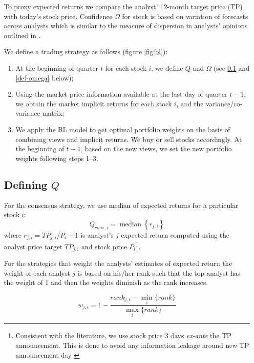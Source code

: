 \documentclass{article}\usepackage[]{graphicx}\usepackage[]{color}
\DeclareMathOperator*{\median}{median}
\begin{document}
To proxy expected returns we compare the analyst' 12-month target price (TP) with today's stock price. Confidence $\Omega$ for stock is based on variation  of forecasts across analysts which is similar to the measure of dispersion in analysts' opinions outlined in \cite{diether2002}.


We define a trading strategy as follows (figure \ref{fig:bl}):
\begin{enumerate}
\item  At the beginning of quarter $t$ for each stock $i$,   we define $Q$ and $\Omega$ (see \ref{def-q} and \ref{def-omega} below);

\item Using the market price information available at the last day of quarter $t-1$, we obtain the market implicit returns for each stock $i$,  and the variance/co-variance matrix;

\item We apply the BL model to get  optimal portfolio weights on the basis of combining views and implicit returns. We  buy or sell stocks accordingly. At the beginning of $t+1$, based on the new views, we set the new portfolio weights following  steps 1--3.
\end{enumerate}

\subsection{Defining $Q$}
\label{def-q}

For the consensus strategy, we use median of expected returns for a particular stock $i$:
\begin{equation}
\label{consq}
Q_{cons,i}= \median \left\{r_{j,i}\right\}
\end{equation}
where $r_{j,i}=TP_{j,i}/P_{i}-1$  is analyst's $j$ expected return computed using the analyst price target $TP_{j,i}$ and stock price $P_{i}$\footnote{Consistent with the literature, we use stock price 3 days \emph{ex-ante} the TP announcement. This is done to avoid any information leakage around new TP announcement day \citep{bonini2010}}. 

For the strategies that weight the analysts' estimates of expected return the weight of each analyst $j$ is based on his/her rank such that the top analyst has the weight of 1 and then the weights diminish as the rank increases.


\begin{equation}
\label{eq:weight}
w_{j,i}=1-\frac{rank_{j,i}-\min_i{ \{rank \} }}{\max_i{\{rank \}}}
\end{equation}
\end{document}
